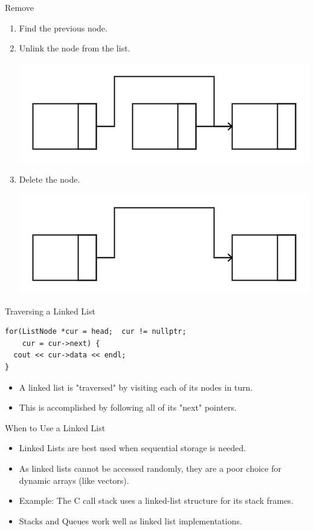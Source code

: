 \documentclass{beamer}
\begin{document}
\begin{frame}{Remove}
    \begin{enumerate}[<+->]
    \item Find the previous node.
    \item Unlink the node from the list.
        \par\includegraphics[height=0.25\textheight]{images/Removing1}
    \item Delete the node.
        \par\includegraphics[height=0.25\textheight]{images/Removing2}
    \end{enumerate}
\end{frame}

\begin{frame}[fragile]{Traversing a Linked List}
    \begin{verbatim}
for(ListNode *cur = head;  cur != nullptr; 
    cur = cur->next) {
  cout << cur->data << endl;
}
    \end{verbatim}
    \begin{itemize}[<+->]
        \item A linked list is "traversed" by visiting each of its nodes in turn.
        \item This is accomplished by following all of its "next" pointers.
    \end{itemize}
\end{frame}

\begin{frame}{When to Use a Linked List}
    \begin{itemize}[<+->]
        \item Linked Lists are best used when sequential storage is needed.
        \item As linked lists cannot be accessed randomly, they are a poor choice for dynamic arrays (like vectors).
        \item Example: The C call stack uses a linked-list structure for its stack frames.
        \item Stacks and Queues work well as linked list implementations.
    \end{itemize}
\end{frame}
\end{document}
